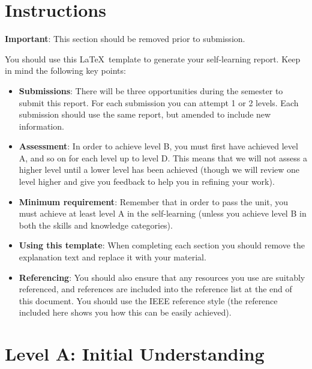 \documentclass[a4paper, 11pt]{report}
\begin{document}

\tableofcontents


\newpage
\section*{Instructions}

\textbf{Important}: This section should be removed prior to submission.

You should use this \LaTeX\ template to generate your self-learning report. Keep in mind the following key points:
\begin{itemize}
	\item \textbf{Submissions}: There will be three opportunities during the semester to submit this report. For each submission you can attempt 1 or 2 levels. Each submission should use the same report, but amended to include new information.
	\item \textbf{Assessment}: In order to achieve level B, you must first have achieved level A, and so on for each level up to level D. This means that we will not assess a higher level until a lower level has been achieved (though we will review one level higher and give you feedback to help you in refining your work).
	\item \textbf{Minimum requirement}: Remember that in order to pass the unit, you must achieve at least level A in the self-learning (unless you achieve level B in both the skills and knowledge categories).
	\item \textbf{Using this template}: When completing each section you should remove the explanation text and replace it with your material.
	\item \textbf{Referencing}: You should also ensure that any resources you use are suitably referenced, and references are included into the reference list at the end of this document. You should use the IEEE reference style \cite{usyd2} (the reference included here shows you how this can be easily achieved).
\end{itemize}




\newpage
\section{Level A: Initial Understanding}
\vspace{5mm}
\end{document}
